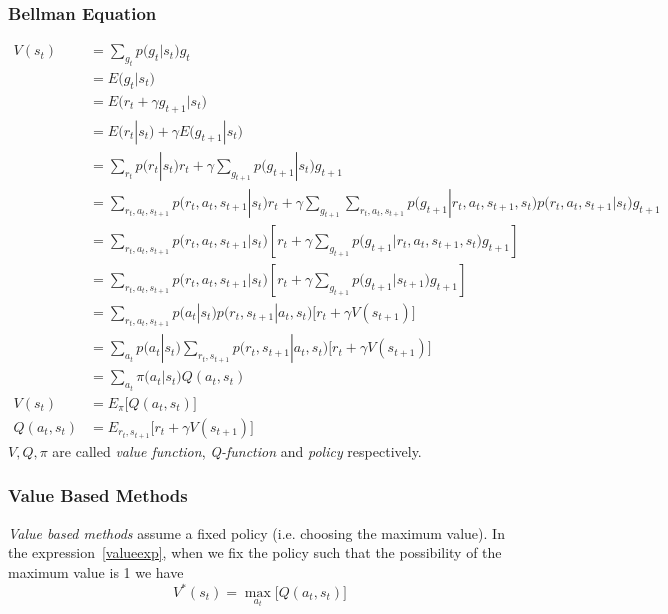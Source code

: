 \documentclass{article}
\begin{document}
\subsubsection{Bellman Equation}
\begin{align}
    V(s_t)
    &= \sum_{g_t}p\big(g_t|s_t\big)g_t\\
    &= E\big(g_t|s_t\big)\\
    &= E\big(r_{t}+\gamma g_{t+1}|s_t\big)\\
    &= E(r_t|s_t)+\gamma E\big(g_{t+1}|s_t\big)\\
    &= \sum_{r_t}p\big(r_t|s_t\big)r_t+\gamma \sum_{g_{t+1}}p\big(g_{t+1}|s_t\big)g_{t+1}\\
    &= \sum_{r_t,a_t,s_{t+1}}p\big(r_t,a_t,s_{t+1}|s_t\big)r_t+\gamma \sum_{g_{t+1}}\sum_{r_t,a_t,s_{t+1}}p\big(g_{t+1}|r_t,a_t,s_{t+1},s_t\big)p\big(r_t,a_t,s_{t+1}|s_t\big)g_{t+1}\\
    &= \sum_{r_t,a_t,s_{t+1}}p\big(r_t,a_t,s_{t+1}|s_t\big)\left[r_t+\gamma \sum_{g_{t+1}}p\big(g_{t+1}|r_t,a_t,s_{t+1},s_t\big)g_{t+1}\right]\\
    &= \sum_{r_t,a_t,s_{t+1}}p\big(r_t,a_t,s_{t+1}|s_t\big)\left[r_t+\gamma \sum_{g_{t+1}}p\big(g_{t+1}|s_{t+1}\big)g_{t+1}\right]\\
    &= \sum_{r_t,a_t,s_{t+1}}p\big(a_t|s_t\big)p\big(r_t,s_{t+1}|a_t,s_t\big)\big[r_t+\gamma V(s_{t+1})\big]\\
    &= \sum_{a_t}p\big(a_t|s_t\big)\sum_{r_t,s_{t+1}}p\big(r_t,s_{t+1}|a_t,s_t\big)\big[r_t+\gamma V(s_{t+1})\big]\\
    &= \sum_{a_t}\pi\big(a_t|s_t\big)Q(a_t, s_t)\\
    V(s_t) &= E_\pi\big[Q(a_t, s_t)\big]\\
    Q(a_t, s_t) &= E_{r_t, s_{t+1}}\big[r_t+\gamma V(s_{t+1})\big]\label{valueexp}
\end{align}
$V, Q, \pi$ are called \textit{value function}, \textit{Q-function} and \textit{policy} respectively.
\subsubsection{Value Based Methods}
\textit{Value based methods} assume a fixed policy (i.e. choosing the maximum value). In the expression~\ref{valueexp}, when we fix the policy such that the possibility of the maximum value is 1 we have
\begin{equation}
    V^*(s_t) = \max_{a_t}\big[Q(a_t, s_t)\big]
\end{equation}
\end{document}
